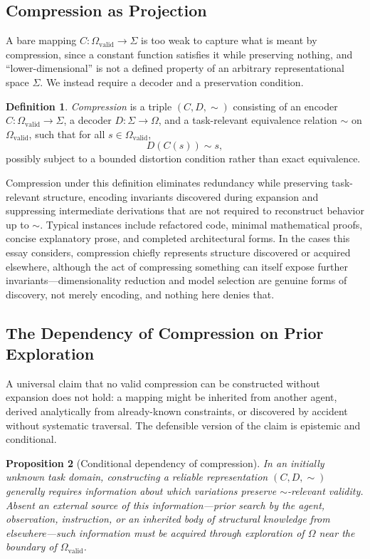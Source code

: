 \documentclass[12pt, a4paper]{article}
\theoremstyle{plain}
\newtheorem{proposition}{Proposition}[section]
\theoremstyle{definition}
\newtheorem{definition}[proposition]{Definition}
\theoremstyle{remark}
\begin{document}
\subsection{Compression as Projection}
\label{subsec:compression}

A bare mapping $C: \Omega_{\mathrm{valid}} \to \Sigma$ is too weak to capture what is meant by compression, since a constant function satisfies it while preserving nothing, and ``lower-dimensional'' is not a defined property of an arbitrary representational space $\Sigma$. We instead require a decoder and a preservation condition.

\begin{definition}
\emph{Compression} is a triple $(C, D, \sim)$ consisting of an encoder $C: \Omega_{\mathrm{valid}} \to \Sigma$, a decoder $D: \Sigma \to \Omega$, and a task-relevant equivalence relation $\sim$ on $\Omega_{\mathrm{valid}}$, such that for all $s \in \Omega_{\mathrm{valid}}$,
\[
D(C(s)) \sim s,
\]
possibly subject to a bounded distortion condition rather than exact equivalence.
\end{definition}

Compression under this definition eliminates redundancy while preserving task-relevant structure, encoding invariants discovered during expansion and suppressing intermediate derivations that are not required to reconstruct behavior up to $\sim$. Typical instances include refactored code, minimal mathematical proofs, concise explanatory prose, and completed architectural forms. In the cases this essay considers, compression chiefly represents structure discovered or acquired elsewhere, although the act of compressing something can itself expose further invariants---dimensionality reduction and model selection are genuine forms of discovery, not merely encoding, and nothing here denies that.

\subsection{The Dependency of Compression on Prior Exploration}
\label{subsec:dependency}

A universal claim that no valid compression can be constructed without expansion does not hold: a mapping might be inherited from another agent, derived analytically from already-known constraints, or discovered by accident without systematic traversal. The defensible version of the claim is epistemic and conditional.

\begin{proposition}[Conditional dependency of compression]
\label{prop:compression-requires-expansion}
In an initially unknown task domain, constructing a reliable representation $(C, D, \sim)$ generally requires information about which variations preserve $\sim$-relevant validity. Absent an external source of this information---prior search by the agent, observation, instruction, or an inherited body of structural knowledge from elsewhere---such information must be acquired through exploration of $\Omega$ near the boundary of $\Omega_{\mathrm{valid}}$.
\end{proposition}
\end{document}

